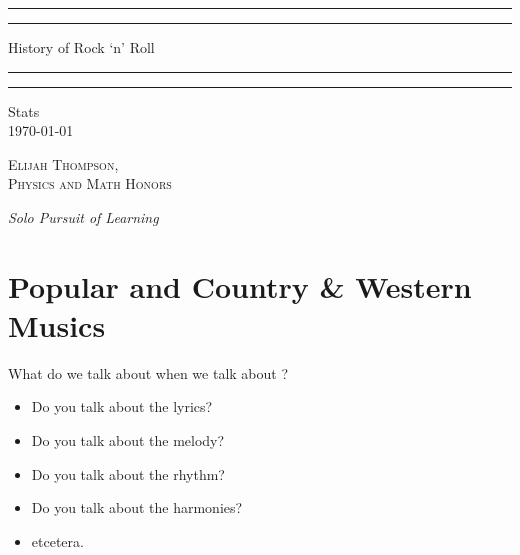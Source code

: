 \documentclass[12pt, a4paper, twoside, openright, titlepage]{book}
\begin{document}

\begin{titlepage}
    \centering
    \scshape
    \vspace*{\baselineskip}
    \rule{\textwidth}{1.6pt}\vspace*{-\baselineskip}\vspace*{2pt}
    \rule{\textwidth}{0.4pt}
    
    \vspace{0.75\baselineskip}
    
    {\LARGE History of Rock `n' Roll}
    
    \vspace{0.75\baselineskip}
    
    \rule{\textwidth}{0.4pt}\vspace*{-\baselineskip}\vspace{3.2pt}
    \rule{\textwidth}{1.6pt}
    
    \vspace{2\baselineskip}
    Stats \\
    \vspace*{3\baselineskip}
    \monthdayyeardate\today \\
    \vspace*{5.0\baselineskip}
    
    {\scshape\Large Elijah Thompson, \\ Physics and Math Honors\\}
    
    \vspace{1.0\baselineskip}
    \textit{Solo Pursuit of Learning}
\end{titlepage}

\tableofcontents


\chapter{Popular and Country \& Western Musics}

\begin{qst}{}{}
    What do we talk about when we talk about ?
\end{qst}
\begin{itemize}
    \item Do you talk about the lyrics?
    \item Do you talk about the melody?
    \item Do you talk about the rhythm?
    \item Do you talk about the harmonies?
    \item etcetera.
\end{itemize}
\end{document}
